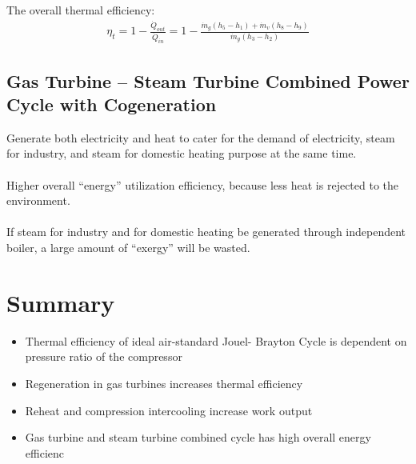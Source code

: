 \documentclass[class=report, crop=false, 12pt,a4paper]{standalone}
\numberwithin{equation}{section}
\begin{document}
The overall thermal efficiency:
\begin{gather}
  \eta_t = 1-\frac{\dot{Q}_{out}}{\dot{Q}_{in}} = 1-\frac{\dot{m}_g(h_5-h_1)+\dot{m}_v(h_8-h_9)}{\dot{m}_g(h_3-h_2)}
\end{gather}
\subsection{Gas Turbine – Steam Turbine Combined Power Cycle with Cogeneration}
Generate both electricity and heat to cater for the demand of electricity, steam for industry, and steam for domestic heating purpose at the same time. \\\\
Higher overall “energy” utilization efficiency, because less heat is rejected to the environment. \\\\
If steam for industry and for domestic heating be generated through independent boiler, a large amount of “exergy” will be wasted. 
\section{Summary}
\begin{itemize}[noitemsep]
  \item Thermal efficiency of ideal air-standard Jouel- Brayton Cycle is dependent on pressure ratio of the compressor
  \item Regeneration in gas turbines increases thermal efficiency
  \item Reheat and compression intercooling increase work output
  \item Gas turbine and steam turbine combined cycle has high overall energy efficienc
\end{itemize}
\end{document}
